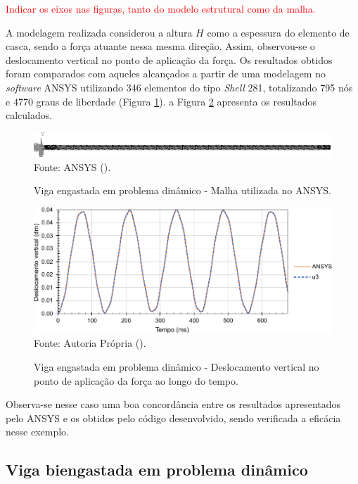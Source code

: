 \textcolor{red}{Indicar os eixos nas figuras, tanto do modelo estrutural como da malha.}

A modelagem realizada considerou a altura $H$ como a espessura do elemento de casca, sendo a força atuante nessa mesma direção. Assim, observou-se o deslocamento vertical no ponto de aplicação da força. Os resultados obtidos foram comparados com aqueles alcançados a partir de uma modelagem no \textit{software} ANSYS utilizando 346 elementos do tipo \textit{Shell} 281, totalizando 795 nós e 4770 graus de liberdade (Figura \ref{fig:beamANSYS1}). a Figura \ref{fig:res-viga1} apresenta os resultados calculados.

\begin{figure}[h!]
    \centering
    \caption{Viga engastada em problema dinâmico - Malha utilizada no ANSYS.}
    \includegraphics[width=\linewidth]{Figuras/vigas/ANSYSmesh1.png}
    \\Fonte: ANSYS (\the\year).
    \label{fig:beamANSYS1}
\end{figure}

\begin{figure}[h!]
    \centering
    \caption{Viga engastada em problema dinâmico - Deslocamento vertical no ponto de aplicação da força ao longo do tempo.}
    \includegraphics[width=.8\linewidth]{Figuras/vigas/res1.pdf}
    \\Fonte: Autoria Própria (\the\year).
    \label{fig:res-viga1}
\end{figure}

Observa-se nesse caso uma boa concordância entre os resultados apresentados pelo ANSYS e os obtidos pelo código desenvolvido, sendo verificada a eficácia nesse exemplo.

\subsection{Viga biengastada em problema dinâmico} \label{Ap:DinBeam2}

